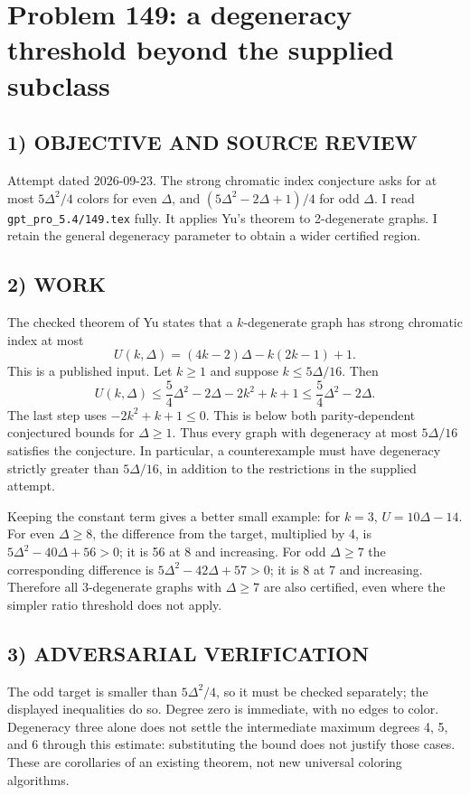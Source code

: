 \section{Problem 149: a degeneracy threshold beyond the supplied subclass}
\subsection*{1) OBJECTIVE AND SOURCE REVIEW}
Attempt dated 2026-09-23. The strong chromatic index conjecture asks for at most $5\Delta^2/4$ colors for even $\Delta$, and $(5\Delta^2-2\Delta+1)/4$ for odd $\Delta$. I read \texttt{gpt\_pro\_5.4/149.tex} fully. It applies Yu's theorem to 2-degenerate graphs. I retain the general degeneracy parameter to obtain a wider certified region.
\subsection*{2) WORK}
The checked theorem of Yu states that a $k$-degenerate graph has strong chromatic index at most
\[
U(k,\Delta)=(4k-2)\Delta-k(2k-1)+1.
\]
This is a published input. Let $k\ge1$ and suppose $k\le5\Delta/16$. Then
\[
U(k,\Delta)\le\frac54\Delta^2-2\Delta-2k^2+k+1
\le\frac54\Delta^2-2\Delta.
\]
The last step uses $-2k^2+k+1\le0$. This is below both parity-dependent conjectured bounds for $\Delta\ge1$. Thus every graph with degeneracy at most $5\Delta/16$ satisfies the conjecture. In particular, a counterexample must have degeneracy strictly greater than $5\Delta/16$, in addition to the restrictions in the supplied attempt.

Keeping the constant term gives a better small example: for $k=3$, $U=10\Delta-14$. For even $\Delta\ge8$, the difference from the target, multiplied by 4, is $5\Delta^2-40\Delta+56>0$; it is 56 at 8 and increasing. For odd $\Delta\ge7$ the corresponding difference is $5\Delta^2-42\Delta+57>0$; it is 8 at 7 and increasing. Therefore all 3-degenerate graphs with $\Delta\ge7$ are also certified, even where the simpler ratio threshold does not apply.
\subsection*{3) ADVERSARIAL VERIFICATION}
The odd target is smaller than $5\Delta^2/4$, so it must be checked separately; the displayed inequalities do so. Degree zero is immediate, with no edges to color. Degeneracy three alone does not settle the intermediate maximum degrees 4, 5, and 6 through this estimate: substituting the bound does not justify those cases. These are corollaries of an existing theorem, not new universal coloring algorithms.
